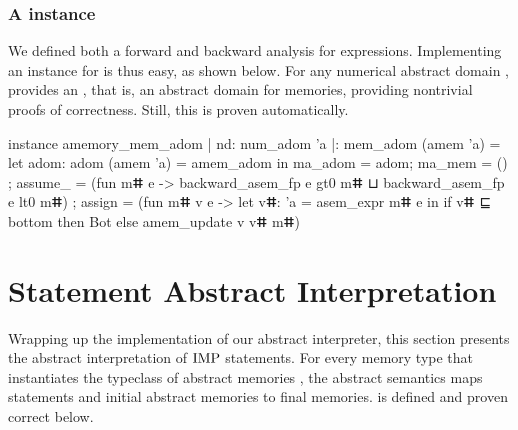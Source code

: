 \documentclass{llncs}
\begin{document}
\subsubsection{A  instance} We defined both a
forward and backward analysis for expressions. Implementing an
 instance for  is thus easy, as shown
below.
%
For any numerical abstract domain ,
 provides an , that is,
an abstract domain for memories, providing nontrivial proofs of
correctness. Still, this is proven automatically.
%
\begin{fstarcode}
instance amemory_mem_adom {| nd: num_adom 'a |}: mem_adom (amem 'a) =
  let adom: adom (amem 'a) = amem_adom in { ma_adom = adom; ma_mem = ()
  ; assume_ = (fun mⵌ e -> backward_asem_fp e gt0 mⵌ ⊔ backward_asem_fp e lt0 mⵌ)
  ; assign = (fun mⵌ v e -> let vⵌ: 'a = asem_expr mⵌ e in
                if vⵌ ⊑ bottom then Bot else amem_update v vⵌ mⵌ)}
\end{fstarcode}
%
\section{Statement Abstract Interpretation}
\label{abint:section:stmt-ab-int}
%
Wrapping up the implementation of our abstract interpreter, this
section presents the abstract interpretation of $\textrm{IMP}{}$
statements.
%
For every memory type  that instantiates the typeclass
of abstract memories , the abstract semantics
 maps statements and initial abstract memories
to final memories.
%
 is defined and proven correct below.
%
\end{document}
